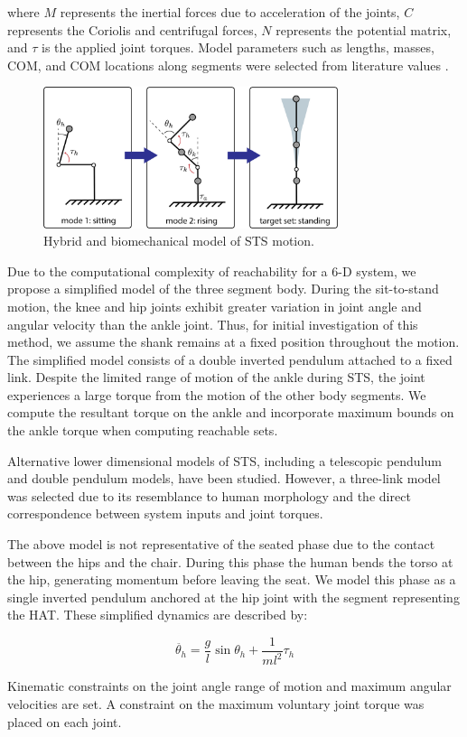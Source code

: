 where $M$ represents the inertial forces due to acceleration of the joints, $C$ represents the Coriolis and centrifugal forces, $N$ represents the potential matrix, and $\tau$ is the applied joint torques. Model parameters such as lengths, masses, COM, and COM locations along segments were selected from literature values \cite{plagenhoef1983}. 


\begin{figure}[h]
  \centering
\includegraphics[width=3.4in]{figures/hybridSys.png}
\caption{Hybrid and biomechanical model of STS motion.}
  \label{fig: dynamics}
\end{figure}

Due to the computational complexity of reachability for a 6-D system, we propose a simplified model of the three segment body. During the sit-to-stand motion, the knee and hip joints exhibit greater variation in joint angle and angular velocity than the ankle joint. Thus, for initial investigation of this method, we assume the shank remains at a fixed position throughout the motion. The simplified model consists of a double inverted pendulum attached to a fixed link. Despite the limited range of motion of the ankle during STS, the joint experiences a large torque from the motion of the other body segments. We compute the resultant torque on the ankle and incorporate maximum bounds on the ankle torque when computing reachable sets. 

Alternative lower dimensional models of STS, including a telescopic pendulum\cite{papa1999} and double pendulum \cite{roberts1996} models, have been studied. However, a three-link model was selected due to its resemblance to human morphology and the direct correspondence between system inputs and joint torques. 

The above model is not representative of the seated phase due to the contact between the hips and the chair. During this phase the human bends the torso at the hip, generating momentum before leaving the seat. We model this phase as a single inverted pendulum anchored at the hip joint with the segment representing the HAT. These simplified dynamics are described by:

\begin{equation}
\ddot{\theta_h} = \frac{g}{l} \sin{\theta_h} + \frac{1}{ml^2} \tau_h
\end{equation}


Kinematic constraints on the joint angle range of motion and maximum angular velocities are set. A constraint on the maximum voluntary joint torque was placed on each joint. 
